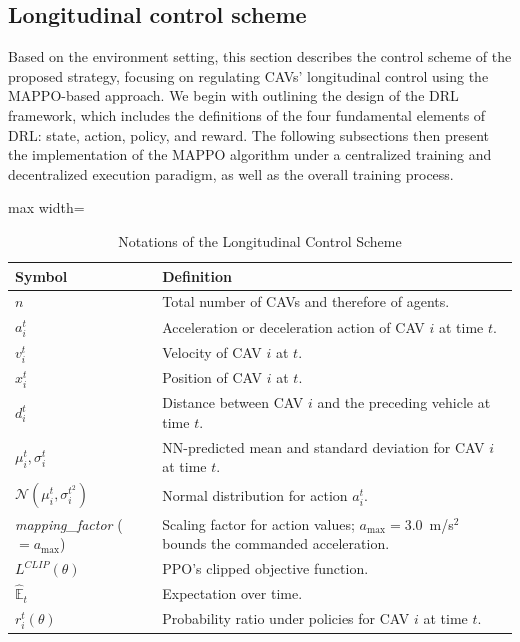 \documentclass{ieeeaccess}
\begin{document}
\subsection{Longitudinal control scheme}
Based on the environment setting, this section describes the control scheme of the proposed strategy, focusing on regulating CAVs’ longitudinal control using the MAPPO-based approach. We begin with outlining the design of the DRL framework, which includes the definitions of the four fundamental elements of DRL: state, action, policy, and reward. The following subsections then present the implementation of the MAPPO algorithm under a centralized training and decentralized execution paradigm, as well as the overall training process.

\begin{table}[htbp]
\centering
\caption{Notations of the Longitudinal Control Scheme}
\label{tab:notation}
\renewcommand{\arraystretch}{1.2} %
\begin{adjustbox}{max width=\linewidth} %
\begin{tabular}{|>{\centering\arraybackslash}m{2.8cm}|>{\centering\arraybackslash}m{10.2cm}|}
\hline
\textbf{Symbol} & \textbf{Definition} \\
\hline
$n$ & Total number of CAVs and therefore of agents. \\
\hline
$a_{i}^{t}$ & Acceleration or deceleration action of CAV $i$ at time $t$. \\
\hline
$v_{i}^{t}$ & Velocity of CAV $i$ at $t$. \\
\hline
$x_{i}^{t}$ & Position of CAV $i$ at $t$. \\
\hline
$d_{i}^{t}$ & Distance between CAV $i$ and the preceding vehicle at time $t$. \\
\hline
$\mu_{i}^{t}, \sigma_{i}^{t}$ & NN-predicted mean and standard deviation for CAV $i$ at time $t$. \\
\hline
$\mathcal{N}(\mu_{i}^{t}, \sigma_{i}^{t^2})$ & Normal distribution for action $a_{i}^{t}$. \\
\hline
\textit{mapping\_factor} ($=a_{\max}$) & Scaling factor for action values; $a_{\max}=3.0$~m/s$^2$ bounds the commanded acceleration. \\
\hline
$L^{CLIP}(\theta)$ & PPO’s clipped objective function. \\
\hline
$\hat{\mathbb{E}}_t$ & Expectation over time. \\
\hline
$r_{i}^{t}(\theta)$ & Probability ratio under policies for CAV $i$ at time $t$. \\

\end{tabular}
\end{adjustbox}
\end{table}
\end{document}
